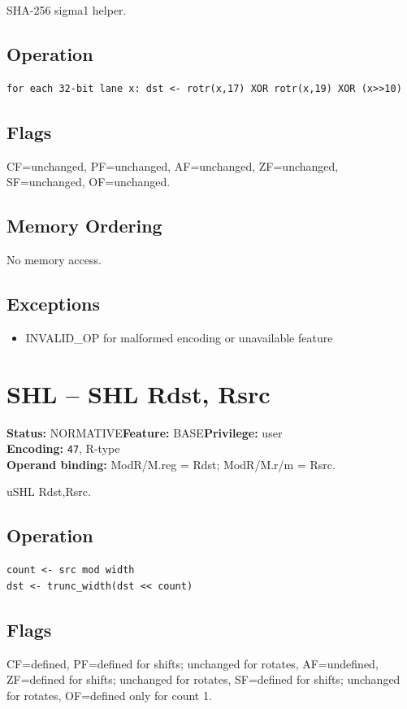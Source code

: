 \documentclass[10pt]{article}
\begin{document}
SHA-256 sigma1 helper.

\subsection*{Operation}
\begin{lstlisting}
for each 32-bit lane x: dst <- rotr(x,17) XOR rotr(x,19) XOR (x>>10)
\end{lstlisting}
\subsection*{Flags}
CF=unchanged, PF=unchanged, AF=unchanged, ZF=unchanged, SF=unchanged, OF=unchanged.
\subsection*{Memory Ordering}
No memory access.
\subsection*{Exceptions}
\begin{itemize}
\item INVALID\_OP for malformed encoding or unavailable feature
\end{itemize}
\clearpage

\section{SHL -- SHL Rdst, Rsrc}
\textbf{Status:} NORMATIVE\quad \textbf{Feature:} BASE\quad \textbf{Privilege:} user\\
\textbf{Encoding:} \texttt{47}, R-type\\
\textbf{Operand binding:} ModR/M.reg = Rdst; ModR/M.r/m = Rsrc.

uSHL Rdst,Rsrc.

\subsection*{Operation}
\begin{lstlisting}
count <- src mod width
dst <- trunc_width(dst << count)
\end{lstlisting}
\subsection*{Flags}
CF=defined, PF=defined for shifts; unchanged for rotates, AF=undefined, ZF=defined for shifts; unchanged for rotates, SF=defined for shifts; unchanged for rotates, OF=defined only for count 1.
\end{document}
